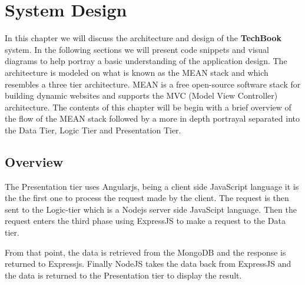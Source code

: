 \chapter{System Design}
In this chapter we will discuss the architecture and design of the \textbf{TechBook} system. In the following sections we will present code snippets and visual diagrams to help portray a basic understanding of the application design. The architecture is modeled on what is known as the MEAN stack and which resembles a three tier architecture. MEAN is a free open-source software stack for building dynamic websites and supports the MVC (Model View Controller) architecture. The contents of this chapter will be begin with a brief overview of the flow of the MEAN stack followed by a more in depth portrayal separated into the Data Tier, Logic Tier and Presentation Tier.

\section{Overview}
The Presentation tier uses Angularjs, being a client side JavaScript language it is the the first one to process the request made by the client. The request is then sent to the Logic-tier which is a Nodejs server side JavaScipt language. Then the request enters the third phase using ExpressJS to make a request to the Data tier.

From that point, the data is retrieved  from the MongoDB and the response is returned to Expressjs. Finally NodeJS takes the data back from ExpressJS and the data is returned to the Presentation tier to display the result.


